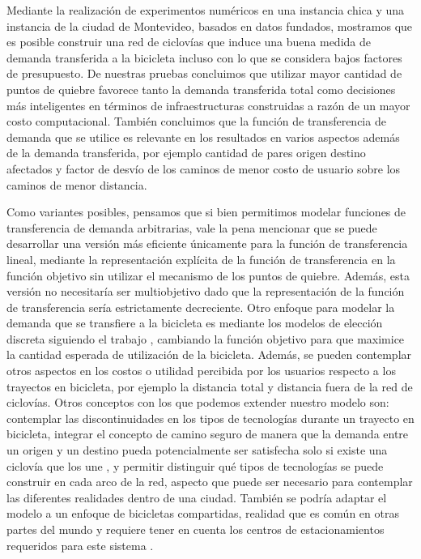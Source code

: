Mediante la realización de experimentos numéricos en una instancia chica y una instancia de la ciudad de Montevideo, basados en datos fundados, mostramos que es posible construir una red de ciclovías que induce una buena medida de demanda transferida a la bicicleta incluso con lo que se considera bajos factores de presupuesto. De nuestras pruebas concluimos que utilizar mayor cantidad de puntos de quiebre favorece tanto la demanda transferida total como decisiones más inteligentes en términos de infraestructuras construidas a razón de un mayor costo computacional. También concluimos que la función de transferencia de demanda que se utilice es relevante en los resultados en varios aspectos además de la demanda transferida, por ejemplo cantidad de pares origen destino afectados y factor de desvío de los caminos de menor costo de usuario sobre los caminos de menor distancia.

Como variantes posibles, pensamos que si bien permitimos modelar funciones de transferencia de demanda arbitrarias, vale la pena mencionar que se puede desarrollar una versión más eficiente únicamente para la función de transferencia lineal, mediante la representación explícita de la función de transferencia en la función objetivo sin utilizar el mecanismo de los puntos de quiebre. Además, esta versión no necesitaría ser multiobjetivo dado que la representación de la función de transferencia sería estrictamente decreciente. Otro enfoque para modelar la demanda que se transfiere a la bicicleta es mediante los modelos de elección discreta siguiendo el trabajo \parencite{Pacheco2021}, cambiando la función objetivo para que maximice la cantidad esperada de utilización de la bicicleta. Además, se pueden contemplar otros aspectos en los costos o utilidad percibida por los usuarios respecto a los trayectos en bicicleta, por ejemplo la distancia total y distancia fuera de la red de ciclovías. Otros conceptos con los que podemos extender nuestro modelo son: contemplar las discontinuidades en los tipos de tecnologías \parencite{baya2021} durante un trayecto en bicicleta, integrar el concepto de camino seguro de manera que la demanda entre un origen y un destino pueda potencialmente ser satisfecha solo si existe una ciclovía que los une \parencite{Duthie2014}, y permitir distinguir qué tipos de tecnologías se puede construir en cada arco de la red, aspecto que puede ser necesario para contemplar las diferentes realidades dentro de una ciudad. También se podría adaptar el modelo a un enfoque de bicicletas compartidas, realidad que es común en otras partes del mundo y requiere tener en cuenta los centros de estacionamientos requeridos para este sistema \parencite{vogel2016}.

